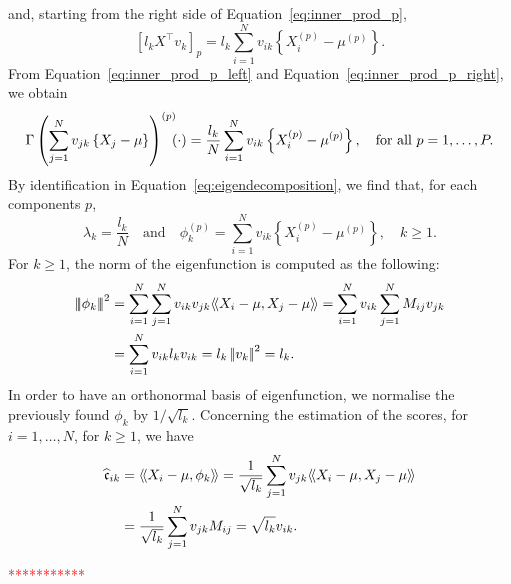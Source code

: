 and, starting from the right side of Equation~\eqref{eq:inner_prod_p},
\begin{equation}\label{eq:inner_prod_p_right}
    [l_k X^\top v_k]_p = l_k \sum_{i = 1}^N v_{ik} \left\{X_i^{(p)} - \mu^{(p)}\right\}.
\end{equation}
From Equation~\eqref{eq:inner_prod_p_left} and Equation~\eqref{eq:inner_prod_p_right}, we obtain
\begin{equation}
    \Gamma\left(\sum_{j = 1}^N v_{jk} \left\{X_j - \mu\right\}\right)^{(p)}\mkern-9mu(\cdot) = \frac{l_k}{N} \sum_{i = 1}^N v_{ik}\left\{X_i^{(p)} - \mu^{(p)}\right\}, \quad\text{for all}~ p = 1, \dots, P.
\end{equation}
By identification in Equation~\eqref{eq:eigendecomposition}, we find that, for each components $p$,
\begin{equation}
\lambda_k = \frac{l_k}{N} \quad\text{and}\quad \phi_k^{(p)} = \sum_{i = 1}^N v_{ik}\left\{X_i^{(p)} - \mu^{(p)}\right\}, \quad k \geq 1.
\end{equation}
For $k \geq 1$, the norm of the eigenfunction is computed as the following:
\begin{align*}
\normH{\phi_k}^2 &= \sum_{i = 1}^N \sum_{j = 1}^N v_{ik} v_{jk}\inH{X_i - \mu}{X_j - \mu} = \sum_{i = 1}^N v_{ik} \sum_{j = 1}^N M_{ij} v_{jk} \\
    &= \sum_{i = 1}^N v_{ik} l_k v_{ik} = l_k \normLp{v_k}^2 = l_k. \\
\end{align*}
In order to have an orthonormal basis of eigenfunction, we normalise the previously found $\phi_k$ by $1 / \sqrt{l_k}$.
Concerning the estimation of the scores, for $i = 1, \dots, N$, for $k \geq 1$, we have
\begin{align}
    \widehat{\mathfrak{c}}_{ik} &= \langle\!\langle X_i - \mu, \phi_k\rangle\!\rangle = \frac{1}{\sqrt{l_k}}\sum_{j = 1}^N v_{jk} \langle\!\langle X_i - \mu, X_j - \mu\rangle\!\rangle\\
    &= \frac{1}{\sqrt{l_k}}\sum_{j = 1}^N v_{jk}M_{ij} = \sqrt{l_k}v_{ik}.\\
\end{align}

\textcolor{red}{***********}

